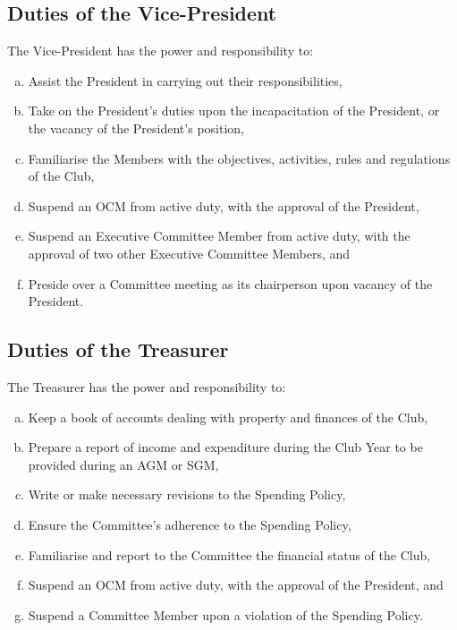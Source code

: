 \documentclass[a4paper,12pt]{article}
\begin{document}
\subsection{Duties of the Vice-President}

The Vice-President has the power and responsibility to:

\begin{enumerate}[a)]
	\item Assist the President in carrying out their responsibilities,
	\item Take on the President's duties upon the incapacitation of the President, or the vacancy of the President's position,
	\item Familiarise the Members with the objectives, activities, rules and regulations of the Club,
	\item Suspend an OCM from active duty, with the approval of the President,
	\item Suspend an Executive Committee Member from active duty, with the approval of two other Executive Committee Members, and
	\item Preside over a Committee meeting as its chairperson upon vacancy of the President.
\end{enumerate}

\subsection{Duties of the Treasurer}

The Treasurer has the power and responsibility to:

\begin{enumerate}[a)]
	\item Keep a book of accounts dealing with property and finances of the Club,
	\item Prepare a report of income and expenditure during the Club Year to be provided during an AGM or SGM,
	\item Write or make necessary revisions to the Spending Policy,
	\item Ensure the Committee's adherence to the Spending Policy,
	\item Familiarise and report to the Committee the financial status of the Club,
	\item Suspend an OCM from active duty, with the approval of the President, and
	\item Suspend a Committee Member upon a violation of the Spending Policy.
\end{enumerate}
\end{document}
